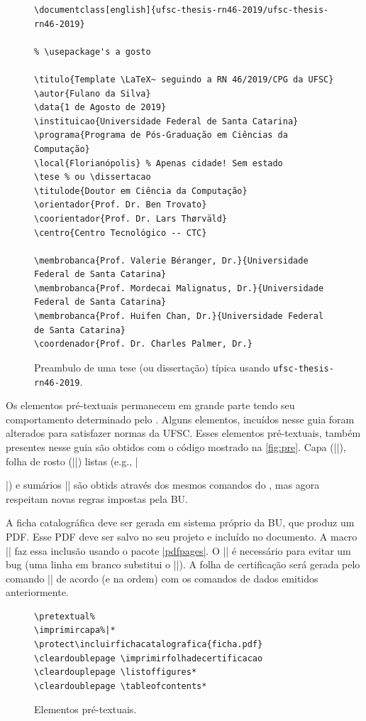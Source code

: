 \documentclass[embeddedlogo]{ufsc-thesis-rn46-2019}
\begin{document}
\begin{figure}[tb]
  \centering
  \caption{Preambulo de uma tese (ou dissertação) típica usando \texttt{ufsc-thesis-rn46-2019}.}
  \label{fig:preambulo}
  \begin{verbatim}
\documentclass[english]{ufsc-thesis-rn46-2019/ufsc-thesis-rn46-2019}

% \usepackage's a gosto

\titulo{Template \LaTeX~ seguindo a RN 46/2019/CPG da UFSC}
\autor{Fulano da Silva}
\data{1 de Agosto de 2019}
\instituicao{Universidade Federal de Santa Catarina}
\programa{Programa de Pós-Graduação em Ciências da Computação}
\local{Florianópolis} % Apenas cidade! Sem estado
\tese % ou \dissertacao
\titulode{Doutor em Ciência da Computação}
\orientador{Prof. Dr. Ben Trovato}
\coorientador{Prof. Dr. Lars Thørväld}
\centro{Centro Tecnológico -- CTC}

\membrobanca{Prof. Valerie Béranger, Dr.}{Universidade Federal de Santa Catarina}
\membrobanca{Prof. Mordecai Malignatus, Dr.}{Universidade Federal de Santa Catarina}
\membrobanca{Prof. Huifen Chan, Dr.}{Universidade Federal de Santa Catarina}
\coordenador{Prof. Dr. Charles Palmer, Dr.}
  \end{verbatim}
\end{figure}

Os elementos pré-textuais permanecem em grande parte tendo seu comportamento determinado pelo \abnTeX. Alguns elementos, incuídos nesse guia foram alterados para satisfazer normas da UFSC. Esses elementos pré-textuais, também presentes nesse guia são obtidos com o código mostrado na \autoref{fig:pre}. Capa (\mt|\imprimircapa|), folha de rosto (\mt|\imprimirfolhaderosto*|) listas (e.g., \mt|\listoffigures*|) e sumários \mt|\tableofcontents*| são obtids através dos mesmos comandos do \abnTeX, mas agora respeitam novas regras impostas pela BU. 

A ficha catalográfica deve ser gerada em sistema próprio da BU, que produz um PDF. Esse PDF deve ser salvo no seu projeto e incluído no documento. A macro \mt|| faz essa inclusão usando o pacote \href{https://www.ctan.org/pkg/pdfpages}{\mt|pdfpages|}. O \mt|\protect| é necessário para evitar um bug (uma linha em branco substitui o \mt|\protect|). A folha de certificação será gerada pelo comando \mt|\imprimirfolhadecertificacao| de acordo (e na ordem) com os comandos de dados emitidos anteriormente.

\begin{figure}[tb]
  \centering
  \caption{Elementos pré-textuais.}
  \label{fig:pre}
  \begin{verbatim}
\pretextual%
\imprimircapa%|*
\protect\incluirfichacatalografica{ficha.pdf}
\cleardoublepage \imprimirfolhadecertificacao
\cleardouplepage \listoffigures*
\cleardoublepage \tableofcontents*
  \end{verbatim}
\end{figure}
\end{document}
